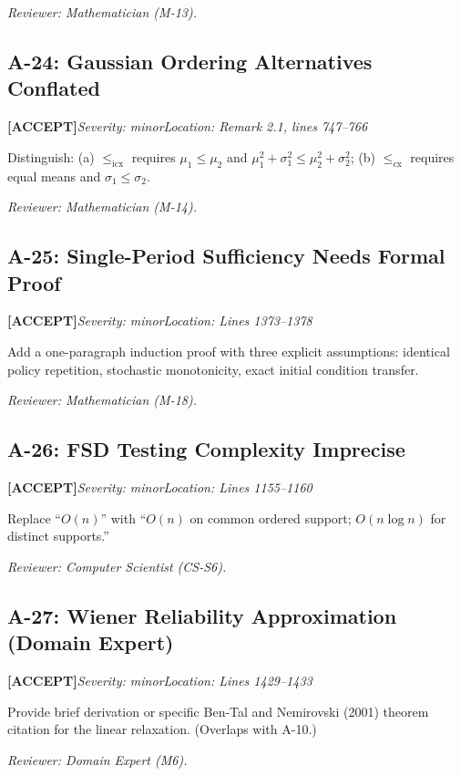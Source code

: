 \documentclass[11pt,a4paper]{article}
\newcommand{\acceptlabel}{\textbf{\textcolor{acceptgreen}{[ACCEPT]}}}
\begin{document}
\textit{Reviewer: Mathematician (M-13).}

\subsection{A-24: Gaussian Ordering Alternatives Conflated}
\acceptlabel\quad\textit{Severity: minor}\quad\textit{Location: Remark 2.1, lines 747--766}

Distinguish: (a) $\le_{\mathrm{icx}}$ requires $\mu_1\le\mu_2$ and $\mu_1^2+\sigma_1^2\le\mu_2^2+\sigma_2^2$; (b) $\le_{\mathrm{cx}}$ requires equal means and $\sigma_1\le\sigma_2$.

\textit{Reviewer: Mathematician (M-14).}

\subsection{A-25: Single-Period Sufficiency Needs Formal Proof}
\acceptlabel\quad\textit{Severity: minor}\quad\textit{Location: Lines 1373--1378}

Add a one-paragraph induction proof with three explicit assumptions: identical policy repetition, stochastic monotonicity, exact initial condition transfer.

\textit{Reviewer: Mathematician (M-18).}

\subsection{A-26: FSD Testing Complexity Imprecise}
\acceptlabel\quad\textit{Severity: minor}\quad\textit{Location: Lines 1155--1160}

Replace ``$O(n)$'' with ``$O(n)$ on common ordered support; $O(n\log n)$ for distinct supports.''

\textit{Reviewer: Computer Scientist (CS-S6).}

\subsection{A-27: Wiener Reliability Approximation (Domain Expert)}
\acceptlabel\quad\textit{Severity: minor}\quad\textit{Location: Lines 1429--1433}

Provide brief derivation or specific Ben-Tal and Nemirovski (2001) theorem citation for the linear relaxation. (Overlaps with A-10.)

\textit{Reviewer: Domain Expert (M6).}


\newpage
\end{document}
